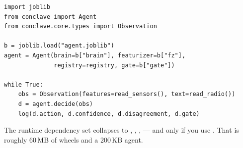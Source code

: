 \begin{codebox}
\begin{lstlisting}[style=py]
import joblib
from conclave import Agent
from conclave.core.types import Observation

b = joblib.load("agent.joblib")
agent = Agent(brain=b["brain"], featurizer=b["fz"],
              registry=registry, gate=b["gate"])

while True:
    obs = Observation(features=read_sensors(), text=read_radio())
    d = agent.decide(obs)
    log(d.action, d.confidence, d.disagreement, d.gate)
\end{lstlisting}
\end{codebox}

\noindent The runtime dependency set collapses to , ,
,  --- and  only if you use
. That is roughly 60\,MB of wheels and a 200\,KB agent.
